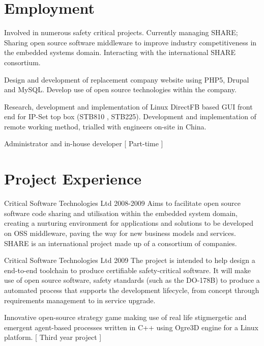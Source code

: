 \documentclass[overlapped,line,letterpaper]{res}
\begin{document}
\begin{resume}
\section{\bf Employment}
{
    Involved in numerous safety critical projects. Currently managing SHARE; 
    Sharing open source software middleware to improve industry competitiveness
    in the embedded systems domain. Interacting with the international SHARE 
    consortium.
}

{
    Design and development of replacement company website using PHP5, Drupal and
    MySQL.
    Develop use of open source technologies within the company.
}

{
    Research, development and implementation of Linux DirectFB based GUI front end
    for IP-Set top box (STB810 , STB225). Development and implementation of remote
    working method, trialled with engineers on-site in China.
}

{
    Administrator and in-house developer [ Part-time ]
}


\section{\bf Project Experience}
  {Critical Software Technologies Ltd}
  {2008-2009}
{
    Aims to facilitate open source software code sharing and utilisation within 
    the embedded system domain, creating a nurturing environment for 
    applications and solutions to be developed on OSS middleware, paving the way
    for new business models and services. 
    SHARE is an international project made up of a consortium of companies.
}

  {Critical Software Technologies Ltd}
  {2009}
{ 
    The project is intended to help design a end-to-end toolchain to produce 
    certifiable safety-critical software. 
    It will make use of open source software, safety standards (such as the 
    DO-178B) to produce a automated process that supports the development 
    lifecycle, from concept through requirements management to in service 
    upgrade. 
}

{
    Innovative open-source strategy game making use of real life stigmergetic 
    and emergent agent-based processes written in C++ using Ogre3D engine for a 
    Linux platform. [ Third year project ]
}


\end{resume}
\end{document}
